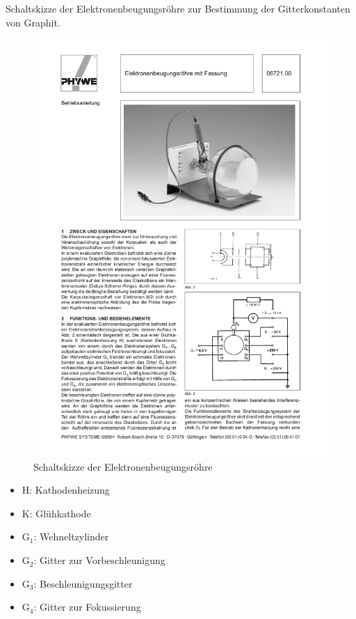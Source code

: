 \documentclass[12pt,a4paper]{article}
\begin{document}
Schaltskizze der Elektronenbeugungsröhre zur Bestimmung der Gitterkonstanten von Graphit.

\begin{figure}[H] 
  \centering
    \includegraphics[trim = 105mm 47mm 10mm 178mm, clip, scale = 1]{beugungsroehre.pdf}
  	\caption[Schaltskizze der Elektronenbeugungsröhre]{Schaltskizze der Elektronenbeugungsröhre\footnotemark}
  \label{fig:aufbau_h}
\end{figure}


\begin{itemize}
\item	H:		Kathodenheizung 

\item	K:		Glühkathode

\item	G$_1$:	Wehneltzylinder 

\item	G$_2$:	Gitter zur Vorbeschleunigung

\item	G$_3$:	Beschleunigungsgitter

\item	G$_4$:	Gitter zur Fokussierung
\end{itemize}
\end{document}
